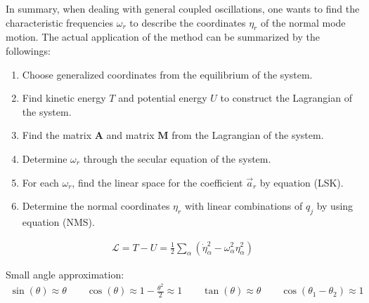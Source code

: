 \documentclass[9pt,oneside]{book}
\theoremstyle{break}
\theoremstyle{break}
\begin{document}
In summary, when dealing with general coupled oscillations, one wants to find the characteristic frequencies $\omega_r$ to describe the coordinates $\eta_r$ of the normal mode motion. The actual application of the method can be summarized by the followings:
\begin{enumerate}[topsep=3pt,itemsep=-1ex,partopsep=1ex,parsep=1ex]
\item Choose generalized coordinates from the equilibrium of the system.
\item Find kinetic energy $T$ and potential energy $U$ to construct the Lagrangian of the system.
\item Find the matrix $\mathbf{A}$ and matrix $\mathbf{M}$ from the Lagrangian of the system.
\item Determine $\omega_r$ through the secular equation of the system.
\item For each $\omega_r$, find the linear space for the coefficient $\vec{a}_r$ by equation (LSK).
\item Determine the normal coordinates $\eta_r$ with linear combinations of $q_j$ by using equation (NMS). 
\end{enumerate}
\begin{align*}
\mathcal{L} = T - U = \frac{1}{2}\sum_\alpha (\dot{\eta}_\alpha^2 - \omega_\alpha^2 \eta_\alpha^2)
\end{align*}


Small angle approximation:
\begin{align*}
\sin(\theta) \approx \theta \qquad \cos(\theta) \approx 1-\frac{\theta^2}{2} \approx 1 \qquad \tan(\theta) \approx \theta \qquad \cos(\theta_1 - \theta_2) \approx 1
\end{align*}
\end{document}
